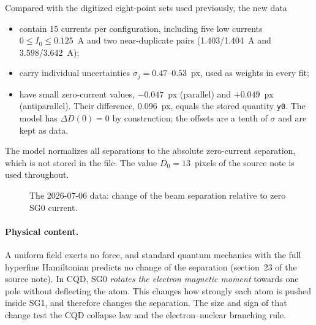 \documentclass[11pt,a4paper]{article}
\newcommand{\pp}{{\uparrow\uparrow}}
\newcommand{\pa}{{\uparrow\downarrow}}
\begin{document}
Compared with the digitized eight-point sets used previously, the new data
\begin{itemize}
\item contain 15 currents per configuration, including five low currents $0\le I_0\le0.125$~A and two
near-duplicate pairs (1.403/1.404~A and 3.598/3.642~A);
\item carry individual uncertainties $\sigma_j=0.47$--$0.53$~px, used as weights in every fit;
\item have small zero-current values, $-0.047$~px (parallel) and $+0.049$~px (antiparallel). Their
difference, 0.096~px, equals the stored quantity \texttt{y0}. The model has $\Delta D(0)=0$ by
construction; the offsets are a tenth of $\sigma$ and are kept as data.
\end{itemize}
The model normalizes all separations to the absolute zero-current separation, which is not stored in
the file. The value $D_0=13$~pixels of the source note is used throughout.

\begin{figure}[h]
\centering
{}
\caption{The 2026-07-06 data: change of the beam separation relative to zero SG0 current.}
\label{fig:data}
\end{figure}

\paragraph{Physical content.} A uniform field exerts no force, and standard quantum mechanics with the
full hyperfine Hamiltonian predicts no change of the separation (section~23 of the source note). In
CQD, SG0 \emph{rotates the electron magnetic moment} towards one pole without deflecting the atom.
This changes how strongly each atom is pushed inside SG1, and therefore changes the separation. The
size and sign of that change test the CQD collapse law and the electron--nuclear branching rule.

\end{document}

